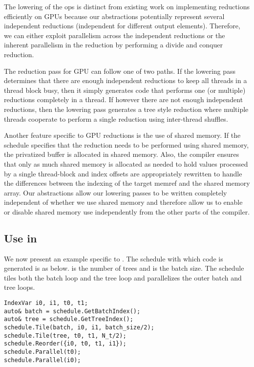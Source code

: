 The lowering of the  ops is distinct from existing 
work on implementing reductions efficiently on GPUs \cite{NVIDIAReductions}
because our abstractions potentially represent several independent reductions
(independent for different output elements).
Therefore, we can either exploit parallelism across the independent reductions or 
the inherent parallelism in the reduction by performing a divide and conquer 
reduction.

The reduction pass for GPU can follow one of two paths. If the lowering pass
determines that there are enough independent reductions to keep all threads
in a thread block busy, then it simply generates code that performs one (or 
multiple) reductions completely in a thread. If however there are not 
enough independent reductions, then the lowering pass generates a tree 
style reduction where multiple threads cooperate to perform a single reduction
using inter-thread shuffles.

Another feature specific to GPU reductions is the use of shared memory. 
If the schedule specifies that the reduction needs to be performed 
using shared memory, the privatized buffer is allocated in shared memory. 
Also, the compiler ensures that only as much shared memory is allocated 
as needed to hold values processed by a single thread-block and 
index offsets are appropriately rewritten to handle the differences between 
the indexing of the target memref and the shared memory array.
Our abstractions allow our lowering passes to be written completely 
independent of whether we use shared memory and therefore allow 
us to enable or disable shared memory use independently from the other 
parts of the compiler. 


\subsection{Use in \Treebeard{}}
We now present an example specific to \Treebeard{}. The schedule with
which code is generated is as below.  is the number of trees 
and  is the batch size. The schedule tiles both the 
batch loop and the tree loop and parallelizes the outer batch 
and tree loops.

\begin{lstlisting}[style=c++]
IndexVar i0, i1, t0, t1;
auto& batch = schedule.GetBatchIndex();
auto& tree = schedule.GetTreeIndex();
schedule.Tile(batch, i0, i1, batch_size/2);
schedule.Tile(tree, t0, t1, N_t/2);
schedule.Reorder({i0, t0, t1, i1});
schedule.Parallel(t0);
schedule.Parallel(i0);
\end{lstlisting}

